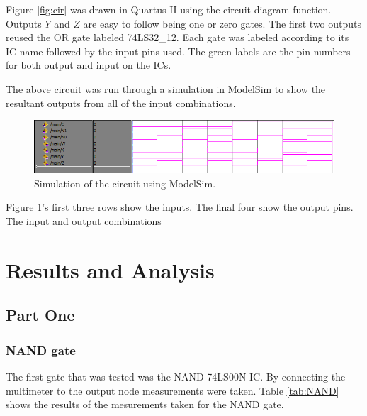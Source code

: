 \documentclass[CMPE]{KGCOEReport}
\begin{document}
Figure \ref{fig:cir} was drawn in Quartus II using the circuit diagram function. Outputs \(Y\) and \(Z\) are easy to follow being one or zero gates. The first two outputs reused the OR gate labeled 74LS32\_12. Each gate was labeled according to its IC name followed by the input pins used. The green labels are the pin numbers for both output and input on the ICs.\par

The above circuit was run through a simulation in ModelSim to show the resultant outputs from all of the input combinations.

\begin{figure}[htbp]
	\centering
	\includegraphics[width=\textwidth]{modelsim}
	\caption{Simulation of the circuit using ModelSim.}
	\label{fig:sim}
\end{figure}

Figure \ref{fig:sim}'s first three rows show the inputs. The final four show the output pins. The input and output combinations

\section*{Results and Analysis}

\subsection*{Part One}
\subsubsection{NAND gate}

The first gate that was tested was the NAND 74LS00N IC. By connecting the multimeter to the output node measurements were taken. Table \ref{tab:NAND} shows the results of the mesurements taken for the NAND gate.
\end{document}

